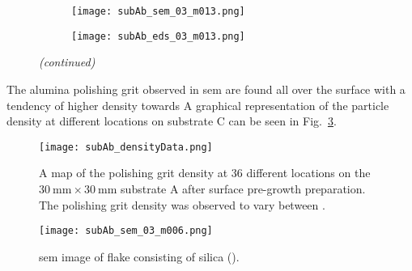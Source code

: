 \begin{figure}[htbp]
\ContinuedFloat
    \centering
    \begin{subfigure}[t]{\textwidth}
          \begin{minipage}[t]{0.49\linewidth}
            \centering
            \texttt{[image: subAb\_sem\_03\_m013.png]}
          \end{minipage}
          \hspace{0.02\linewidth}
          \begin{minipage}[t]{0.49\linewidth}
            \centering
            \texttt{[image: subAb\_eds\_03\_m013.png]}
          \end{minipage}
        \caption{}\label{fig:add_label}
    \end{subfigure}
    \captionsetup{list=no}
    \caption{\emph{(continued)}}
\end{figure}

The alumina polishing grit observed in \ac{sem} are found all over the surface with a tendency of higher density towards  A graphical representation of the particle density at different locations on substrate C can be seen in Fig.~\ref{fig:subAb_densityData}.

\begin{figure}[htbp]
    \centering
    \texttt{[image: subAb\_densityData.png]}
    \caption[Map of the polishing grit density on substrate A after surface pre-growth preparation.]{A map of the polishing grit density at 36 different locations on the $\SI{30}{\milli\metre}\times\SI{30}{\milli\metre}$ substrate A after surface pre-growth preparation. The polishing grit density was observed to vary between .}
    \label{fig:subAb_densityData}
\end{figure}

\begin{figure}
    \centering
    \texttt{[image: subAb\_sem\_03\_m006.png]}
    \caption[\Ac{sem} image of silica flake.]{\Acf{sem} image of flake consisting of silica ().}
\end{figure}

